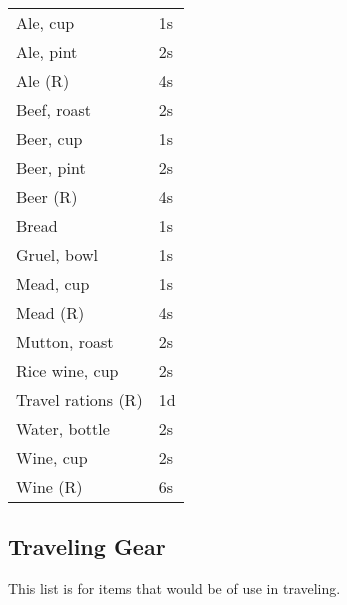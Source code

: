 \begin{center}
{
\begin{xtabular}{|l|l|}
Ale, cup & 1s \\
Ale, pint & 2s \\
Ale (R) & 4s \\
Beef, roast & 2s \\
Beer, cup & 1s \\
Beer, pint & 2s \\
Beer (R) & 4s \\
Bread & 1s \\
Gruel, bowl & 1s \\
Mead, cup & 1s \\
Mead (R) & 4s \\
Mutton, roast & 2s \\
Rice wine, cup & 2s \\
Travel rations (R) & 1d \\
Water, bottle & 2s \\
Wine, cup & 2s \\
Wine (R) & 6s \\
\hline
\end{xtabular}
}
\end{center}

\subsection{Traveling Gear}

This list is for items that would be of use in traveling.

